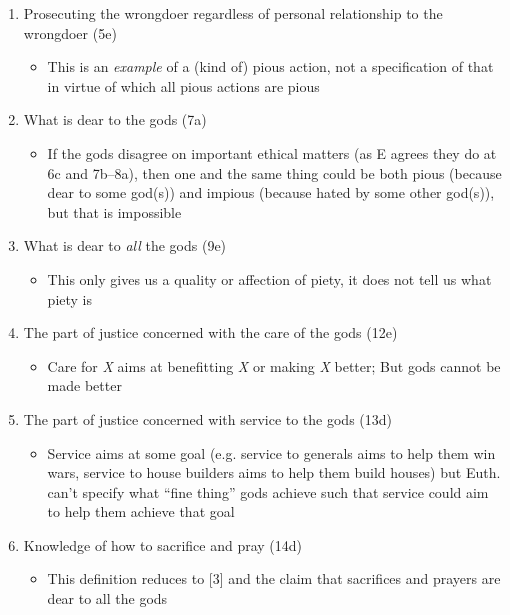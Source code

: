 \documentclass[10 pt]{article}
\begin{document}
\begin{enumerate}

\item Prosecuting the wrongdoer regardless of personal relationship to the wrongdoer (5e)

\begin{itemize}\item{This is an \emph{example} of a (kind of) pious action, not a specification of that in virtue of which all pious actions are pious}\end{itemize}

\item{What is dear to the gods (7a)}

\begin{itemize}\item{If the gods disagree on important ethical matters (as E agrees they do at 6c and 7b--8a), then one and the same thing could be both pious (because dear to some god(s)) and impious (because hated by some other god(s)), but that is impossible}\end{itemize}

\item{What is dear to \emph{all} the gods (9e)}

\begin{itemize}\item{This only gives us a quality or affection of piety, it does not tell us what piety is}\end{itemize}

\item{The part of justice concerned with the care of the gods (12e)}

\begin{itemize}\item{Care for \emph{X} aims at benefitting \emph{X} or making \emph{X} better; But gods cannot be made better}\end{itemize}

\item{The part of justice concerned with service to the gods (13d)}

\begin{itemize}\item{Service aims at some goal (e.g. service to generals aims to help them win wars, service to house builders aims to help them build houses) but Euth. can't specify what ``fine thing'' gods achieve such that service could aim to help them achieve that goal}\end{itemize} 

\item{Knowledge of how to sacrifice and pray (14d)}

\begin{itemize}\item{This definition reduces to [3] and the claim that sacrifices and prayers are dear to all the gods}\end{itemize}

\end{enumerate}
\end{document}
